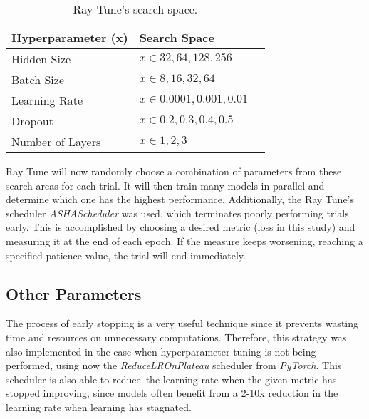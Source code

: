 \begin{table}[ht]
	\caption{Ray Tune's search space.}
	\label{tab:search_space}
    \centering
    \begin{tabular}{lll}
    	\toprule
    	\textbf{Hyperparameter (x)} & \textbf{Search Space} \\\midrule
    	
    	Hidden Size & $x \in 32, 64, 128, 256$ \\\midrule
        Batch Size & $x \in 8, 16, 32, 64$ \\\midrule
        Learning Rate & $x \in 0.0001, 0.001, 0.01$ \\\midrule
        Dropout & $x \in 0.2, 0.3, 0.4, 0.5$ \\\midrule
        Number of Layers & $x \in 1, 2, 3$ \\
        
    	\bottomrule
    \end{tabular}
\end{table}

Ray Tune will now randomly choose a combination of parameters from these search areas for each trial. It will then train many models in parallel and determine which one has the highest performance. Additionally, the Ray Tune's scheduler \textit{ASHAScheduler} was used, which terminates poorly performing trials early. This is accomplished by choosing a desired metric (loss in this study) and measuring it at the end of each epoch. If the measure keeps worsening, reaching a specified patience value, the trial will end immediately. 

\subsection{Other Parameters}

The process of early stopping is a very useful technique since it prevents wasting time and resources on unnecessary computations. Therefore, this strategy was also implemented in the case when hyperparameter tuning is not being performed, using now the \textit{ReduceLROnPlateau} scheduler from \textit{PyTorch}. This scheduler is also able to reduce the learning rate when the given metric has stopped improving, since models often benefit from a 2-10x reduction in the learning rate when learning has stagnated.